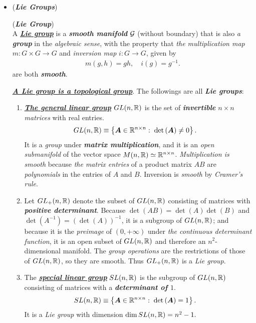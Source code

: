 \documentclass[11pt]{article}
\begin{document}
\begin{itemize}
\item \begin{example} (\emph{\textbf{Lie Groups}})
\begin{definition} (\emph{\textbf{Lie Group}}) \citep{lee2003introduction}\\
A \underline{\emph{\textbf{Lie group}}} is a \emph{\textbf{smooth manifold}} ${\mathcal G}$ (without boundary) that is also \emph{a \textbf{group}} in the
\emph{algebraic sense}, with the property that \emph{the multiplication map} $m: G \times G \rightarrow G$ and \emph{inversion map} $i: G \rightarrow G$, given by
\begin{align*}
m(g, h) = g h, \quad i(g) = g^{-1}.
\end{align*} are both \emph{\textbf{smooth}}. 
\end{definition}
\underline{\emph{\textbf{A Lie group is a topological group}}}. The followings are all \emph{\textbf{Lie groups}}:
\begin{enumerate}
\item \underline{\emph{\textbf{The general linear group}}} $GL(n, {\mathbb R})$ is the set of \emph{\textbf{invertible} $n\times n$ matrices} with real entries.
\begin{align*}
GL(n, {\mathbb R}) &\equiv \left\{\boldsymbol{A}\in {\mathbb R}^{n\times n}:\; \det\left(\boldsymbol{A}\right)\neq 0\right\}. 
\end{align*}
It is a \emph{group} under \emph{\textbf{matrix multiplication}}, and it is an \emph{open submanifold} of the vector space $M(n, {\mathbb R}) \simeq {\mathbb R}^{n \times n}$. \emph{Multiplication is smooth} because \emph{the matrix entries} of a product matrix $AB$ are \emph{polynomials} in the entries of $A$ and $B$. Inversion is \emph{smooth} by \emph{Cramer's rule}.

\item Let $GL_{+}(n, {\mathbb R})$  denote the subset of $GL(n, {\mathbb R})$ consisting of matrices with \emph{\textbf{positive determinant}}. Because $\det(AB) =\det(A)\det(B)$ and $\det(A^{-1})= (\det(A))^{-1}$, it is a subgroup of $GL(n, {\mathbb R})$; and because it is the \emph{preimage} of $(0, +\infty)$ under \emph{the continuous determinant function}, it is an open subset of $GL(n, {\mathbb R})$ and therefore an $n^2$-dimensional manifold. The \emph{group operations} are the restrictions of those of $GL(n, {\mathbb R})$, so they are smooth. Thus  $GL_{+}(n, {\mathbb R})$ is a \emph{Lie group}.

\item The \underline{\emph{\textbf{special linear group}}} $SL(n, {\mathbb R})$ is the subgroup of $GL(n, {\mathbb R})$ consisting of matrices with a \emph{\textbf{determinant of $1$}}.
\begin{align*}
SL(n, {\mathbb R}) &\equiv \left\{\boldsymbol{A}\in {\mathbb R}^{n\times n}:\; \det\left(\boldsymbol{A}\right)= 1\right\}. 
\end{align*}
It is a \emph{Lie group} with dimension $\dim{SL(n,{\mathbb R})} = n^{2} -1.$ 


\end{enumerate}
\end{example}
\end{itemize}
\end{document}

